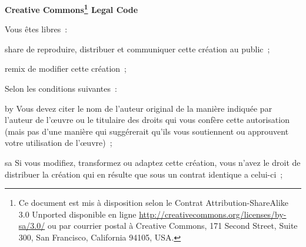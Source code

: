 {}
\begin{center}
  \textbf{\LARGE{Creative Commons\footnote{ Ce document est mis à
        disposition selon le Contrat Attribution-ShareAlike 3.0
        Unported disponible en ligne
        \url{http://creativecommons.org/licenses/by-sa/3.0/} ou par
        courrier postal à Creative Commons, 171 Second Street, Suite
        300, San Francisco, California 94105, USA.} Legal Code} }
\end{center}
\vspace{1cm}

\begin{lblock}{Vous êtes libres~:}

  \begin{pictonote}{share}
    de reproduire, distribuer et communiquer cette création au
    public~;
  \end{pictonote}

  \begin{pictonote}{remix}
    de modifier cette création~;
  \end{pictonote}

\end{lblock}
\begin{lblock}{Selon les conditions suivantes~:}

  \begin{pictonote}{by}
     Vous devez citer le nom de l'auteur
    original de la manière indiquée par l'auteur de l'œuvre ou le
    titulaire des droits qui vous confère cette autorisation (mais pas
    d'une manière qui suggérerait qu'ils vous soutiennent ou
    approuvent votre utilisation de l'œuvre)~;
  \end{pictonote}

  \begin{pictonote}{sa}
     Si
    vous modifiez, transformez ou adaptez cette création, vous n'avez
    le droit de distribuer la création qui en résulte que sous un
    contrat identique a celui-ci~;
  \end{pictonote}

\end{lblock}
